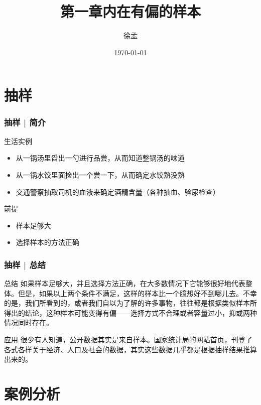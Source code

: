 



\title[抽样]{第一章\quad 内在有偏的样本}
\author[XuM]{徐孟}
\date{\today}



\section{抽样}


\begin{frame}
  \frametitle{抽样 | 简介}
  \begin{block}{生活实例}
    \begin{itemize}
      \item 从一锅汤里舀出一勺进行品尝，从而知道整锅汤的味道
      \item 从一锅水饺里面捡出一个尝一下，从而确定水饺熟没熟
      \item 交通警察抽取司机的血液来确定酒精含量（各种抽血、验尿检查）
    \end{itemize}
  \end{block}
  \pause
  \begin{block}{前提}
    \begin{itemize}
      \item 样本足够大
      \item 选择样本的方法正确
    \end{itemize}
  \end{block}
\end{frame}

\begin{frame}
  \frametitle{抽样 | 总结}
  \begin{block}{总结}
如果样本足够大，并且选择方法正确，在大多数情况下它能够很好地代表整体。但是，如果以上两个条件不满足，这样的样本比一个臆想好不到哪儿去。不幸的是，我们所看到的，或者我们自以为了解的许多事物，往往都是根据类似样本所得出的结论，这种样本可能变得有偏——选择方式不合理或者容量过小，抑或两种情况同时存在。
  \end{block}
  \pause
  \begin{block}{应用}
很少有人知道，公开数据其实是来自样本。国家统计局的网站首页，刊登了各式各样关于经济、人口及社会的数据，其实这些数据几乎都是根据抽样结果推算出来的。
  \end{block}
\end{frame}

\section{案例分析}
